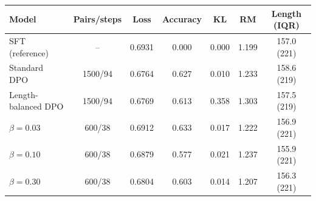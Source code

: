 \begin{tabular}{l c c c c c c}
  \toprule
  \textbf{Model} & \textbf{Pairs/steps} & \textbf{Loss} & \textbf{Accuracy} & \textbf{KL} & \textbf{RM} & \textbf{Length (IQR)} \\
  \midrule
    SFT (reference) & -- & 0.6931 & 0.000 & 0.000 & 1.199 & 157.0 (221) \\
    \midrule
    Standard DPO & 1500/94 & 0.6764 & 0.627 & 0.010 & 1.233 & 158.6 (219) \\
    Length-balanced DPO & 1500/94 & 0.6769 & 0.613 & 0.358 & 1.303 & 157.5 (219) \\
    \midrule
    $\beta = 0.03$ & 600/38 & 0.6912 & 0.633 & 0.017 & 1.222 & 156.9 (221) \\
    $\beta = 0.10$ & 600/38 & 0.6879 & 0.577 & 0.021 & 1.237 & 155.9 (221) \\
    $\beta = 0.30$ & 600/38 & 0.6804 & 0.603 & 0.014 & 1.207 & 156.3 (221) \\
  \bottomrule
\end{tabular}
